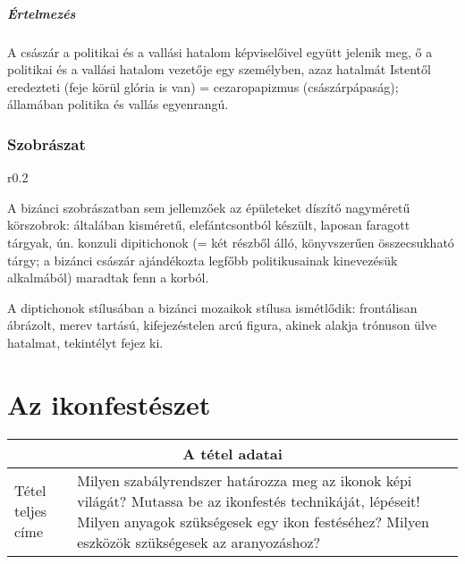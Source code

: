	\subparagraph{Értelmezés}
	A császár a politikai és a vallási hatalom képviselőivel együtt jelenik meg, ő a politikai és a vallási hatalom vezetője egy személyben, azaz hatalmát Istentől eredezteti (feje körül glória is van) = cezaropapizmus (császárpápaság); államában politika és vallás egyenrangú.
	
	

\subsubsection{Szobrászat}

\begin{wrapfigure}{r}{0.2\textwidth}
\end{wrapfigure}

A bizánci szobrászatban sem jellemzőek az épületeket díszítő nagyméretű körszobrok: általában kisméretű, elefántcsontból készült, laposan faragott tárgyak, ún. konzuli dipitichonok (= két részből álló, könyvszerűen összecsukható tárgy; a bizánci császár ajándékozta legfőbb politikusainak kinevezésük alkalmából) maradtak fenn a korból.

A diptichonok stílusában a bizánci mozaikok stílusa ismétlődik: frontálisan ábrázolt, merev tartású, kifejezéstelen arcú figura, akinek alakja trónuson ülve hatalmat, tekintélyt fejez ki.

\cleardoublepage

\section{Az ikonfestészet}

\begin{center}
	\begin{longtable}{ | p{} | p{} | }
		
		\hline
		\multicolumn{2}{|c|}{\textbf{A tétel adatai}}
		\\ \hline
		
		\hline
		Tétel teljes címe 
		&
		Milyen szabályrendszer határozza meg az ikonok képi világát? Mutassa be az ikonfestés technikáját, lépéseit! Milyen anyagok szükségesek egy ikon festéséhez? Milyen eszközök szükségesek az aranyozáshoz?
		\\ \hline
		
	\end{longtable}
\end{center}

